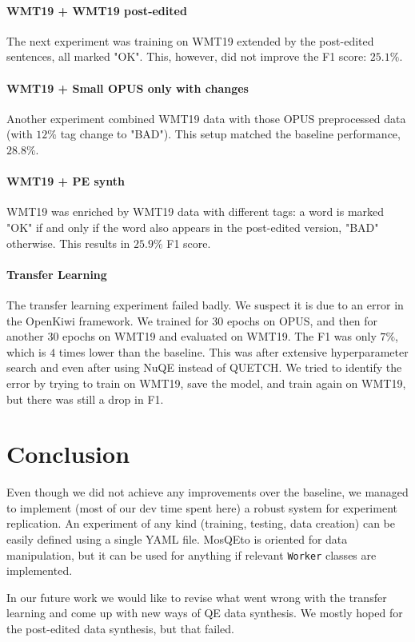 \documentclass[12pt]{article}
\begin{document}
\paragraph{WMT19 + WMT19 post-edited} The next experiment was training on WMT19 extended by the post-edited sentences, all marked "OK". 
This, however, did not improve the F1 score: $25.1\%$.

\paragraph{WMT19 + Small OPUS only with changes} Another experiment combined WMT19 data with those OPUS preprocessed data (with $12\%$ tag change to "BAD"). This setup matched the baseline performance, $28.8\%$.

\paragraph{WMT19 + PE synth} WMT19 was enriched by WMT19 data with different tags: a word is marked "OK" if and only if the word also appears in the post-edited version, "BAD" otherwise. This results in $25.9\%$ F1 score.

\paragraph{Transfer Learning} The transfer learning experiment failed badly. 
We suspect it is due to an error in the OpenKiwi framework.
We trained for 30 epochs on OPUS, and then for another 30 epochs on WMT19 and evaluated on WMT19.
The F1 was only $7\%$, which is $4$ times lower than the baseline.
This was after extensive hyperparameter search and even after using NuQE instead of QUETCH.
We tried to identify the error by trying to train on WMT19, save the model, and train again on WMT19, but there was still a drop in F1.

\section{Conclusion}

Even though we did not achieve any improvements over the baseline, we managed to implement (most of our dev time spent here) a robust system for experiment replication. An experiment of any kind (training, testing, data creation) can be easily defined using a single YAML file. MosQEto is oriented for data manipulation, but it can be used for anything if relevant \texttt{Worker} classes are implemented.

In our future work we would like to revise what went wrong with the transfer learning and come up with new ways of QE data synthesis. We mostly hoped for the post-edited data synthesis, but that failed.

\pagebreak


\end{document}
